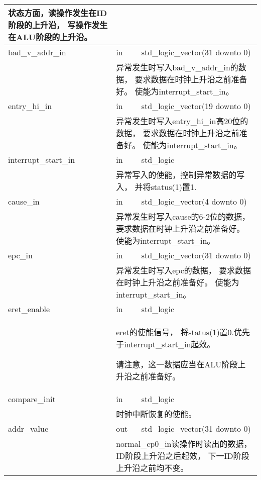 \begin{tabularx}{\textwidth}{lll}
{	            状态方面，读操作发生在ID阶段的上升沿，%
                写操作发生在ALU阶段的上升沿。
            } \\
            \midrule
	        bad\_v\_addr\_in & in       & std\_logic\_vector(31 downto 0) \\
            \cmidrule(l){2-3}
            &
            \multicolumn{2}{X}{
	            异常发生时写入bad\_v\_addr\_in的数据，%
                要求数据在时钟上升沿之前准备好。%
                使能为interrupt\_start\_in。
            } \\
            \midrule
	        entry\_hi\_in   & in        & std\_logic\_vector(19 downto 0) \\
            \cmidrule(l){2-3}
            &
            \multicolumn{2}{X}{
	            异常发生时写入entry\_hi\_in高20位的数据，%
                要求数据在时钟上升沿之前准备好。%
                使能为interrupt\_start\_in。
            } \\
            \midrule
	        interrupt\_start\_in & in   & std\_logic \\
            \cmidrule(l){2-3}
            &
            \multicolumn{2}{X}{
	            异常写入的使能，控制异常数据的写入，%
                并将status(1)置1.
            } \\
            \midrule
	        cause\_in       & in        & std\_logic\_vector(4 downto 0) \\
            \cmidrule(l){2-3}
            &
            \multicolumn{2}{X}{
	            异常发生时写入cause的6-2位的数据，%
                要求数据在时钟上升沿之前准备好。%
                使能为interrupt\_start\_in。
            } \\
            \midrule
	        epc\_in         & in        & std\_logic\_vector(31 downto 0) \\
            \cmidrule(l){2-3}
            &
            \multicolumn{2}{X}{
	            异常发生时写入epc的数据，%
                要求数据在时钟上升沿之前准备好。%
                使能为interrupt\_start\_in。
            } \\
            \midrule
	        eret\_enable    & in        & std\_logic \\
            \cmidrule(l){2-3}
            &
            \multicolumn{2}{X}{
	            eret的使能信号，%
                将status(1)置0.优先于interrupt\_start\_in起效。

	            请注意，这一数据应当在ALU阶段上升沿之前准备好。
            } \\
            \midrule
	        compare\_init   & in        & std\_logic \\
	        \cmidrule(l){2-3}
            &
            \multicolumn{2}{X}{
                时钟中断恢复的使能。
            } \\
            \midrule
	        addr\_value     & out       & std\_logic\_vector(31 downto 0) \\
            \cmidrule(l){2-3}
            &
            \multicolumn{2}{X}{
	            normal\_cp0\_in读操作时读出的数据，%
                ID阶段上升沿之后起效，%
                下一ID阶段上升沿之前均不变。

}
\end{tabularx}

